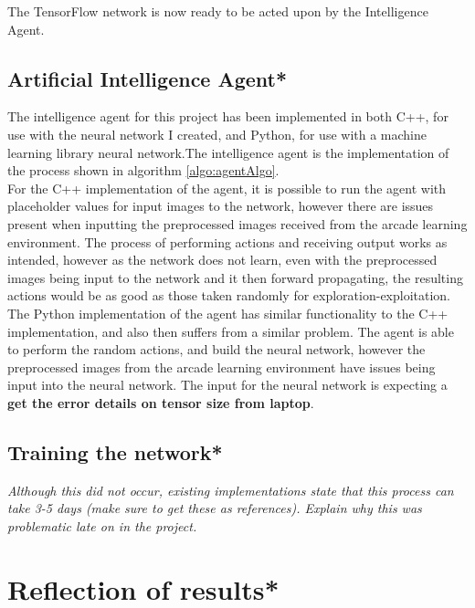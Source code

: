 \documentclass[10pt]{article}
\begin{document}
		The TensorFlow network is now ready to be acted upon by the Intelligence Agent.
		
	\medskip
	
	\subsection{Artificial Intelligence Agent*}
		The intelligence agent for this project has been implemented in both C++, for use with the neural network I created, and Python, for use with a machine learning library neural network.The intelligence agent is the implementation of the process shown in algorithm \ref{algo:agentAlgo}.\\
		
		For the C++ implementation of the agent, it is possible to run the agent with placeholder values for input images to the network, however there are issues present when inputting the preprocessed images received from the arcade learning environment. The process of performing actions and receiving output works as intended, however as the network does not learn, even with the preprocessed images being input to the network and it then forward propagating, the resulting actions would be as good as those taken randomly for exploration-exploitation.\\
		
		The Python implementation of the agent has similar functionality to the C++ implementation, and also then suffers from a similar problem. The agent is able to perform the random actions, and build the neural network, however the preprocessed images from the arcade learning environment have issues being input into the neural network. The input for the neural network is expecting a \textbf{get the error details on tensor size from laptop}.
	\medskip	
	
	\subsection{Training the network*}
		\textit{Although this did not occur, existing implementations state that this process can take 3-5 days (make sure to get these as references). Explain why this was problematic late on in the project.}

	\bigskip
\section{Reflection of results*}
\end{document}
